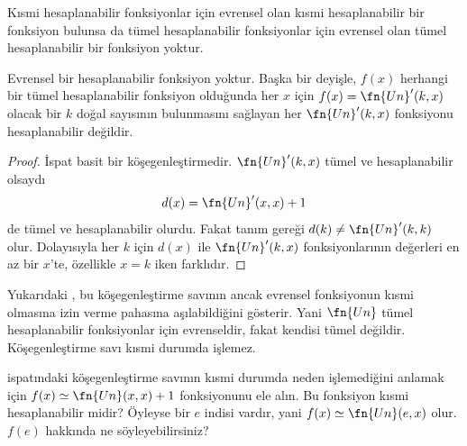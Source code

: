 \documentclass[../../../include/open-logic-section]{subfiles}
\begin{document}

Kısmi hesaplanabilir fonksiyonlar için evrensel olan kısmi hesaplanabilir bir
fonksiyon bulunsa da tümel hesaplanabilir fonksiyonlar için evrensel olan
tümel hesaplanabilir bir fonksiyon yoktur.

\begin{thm}
Evrensel bir hesaplanabilir fonksiyon yoktur. Başka bir deyişle, $f(x)$
herhangi bir tümel hesaplanabilir fonksiyon olduğunda her $x$ için
$f(x)=\fn{Un}'(k,x)$ olacak bir $k$ doğal sayısının bulunmasını sağlayan
her $\fn{Un}'(k,x)$ fonksiyonu hesaplanabilir değildir.
\end{thm}

\begin{proof}
İspat basit bir köşegenleştirmedir. $\fn{Un}'(k,x)$ tümel ve hesaplanabilir
olsaydı
\[
  d(x)=\fn{Un}'(x,x)+1
\]
de tümel ve hesaplanabilir olurdu. Fakat tanım gereği
$d(k)\neq\fn{Un}'(k,k)$ olur. Dolayısıyla her $k$ için $d(x)$ ile
$\fn{Un}'(k,x)$ fonksiyonlarının değerleri en az bir $x$'te, özellikle
$x=k$ iken farklıdır.
\end{proof}

\begin{explain}
Yukarıdaki , bu köşegenleştirme savının ancak
evrensel fonksiyonun kısmi olmasına izin verme pahasına aşılabildiğini
gösterir. Yani $\fn{Un}$ tümel hesaplanabilir fonksiyonlar için evrenseldir,
fakat kendisi tümel değildir. Köşegenleştirme savı kısmi durumda işlemez.
\end{explain}

\begin{prob}
   ispatındaki köşegenleştirme savının kısmi durumda neden
  işlemediğini anlamak için $f(x)\simeq\fn{Un}(x,x)+1$ fonksiyonunu ele alın.
  Bu fonksiyon kısmi hesaplanabilir midir? Öyleyse bir $e$ indisi vardır,
  yani $f(x)\simeq\fn{Un}(e,x)$ olur. $f(e)$ hakkında ne söyleyebilirsiniz?
\end{prob}
\end{document}
